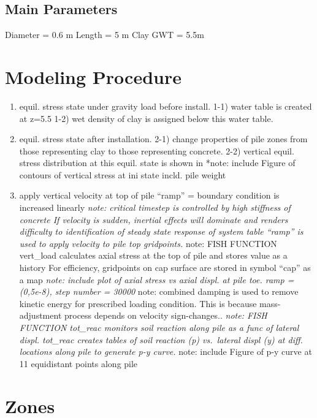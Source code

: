 \documentclass[a4paper, nobind]{templates/ociamthesis}
\providecommand{\tightlist}{%
  \setlength{\itemsep}{0pt}\setlength{\parskip}{0pt}}
\begin{document}
\hypertarget{main-parameters}{%
\subsection{Main Parameters}\label{main-parameters}}

Diameter = 0.6 m
Length = 5 m
Clay
GWT = 5.5m

\hypertarget{modeling-procedure}{%
\section{Modeling Procedure}\label{modeling-procedure}}

\begin{enumerate}
\def\labelenumi{\arabic{enumi})}
\tightlist
\item
  equil. stress state under gravity load before install.
  1-1) water table is created at z=5.5
  1-2) wet density of clay is assigned below this water table.
\item
  equil. stress state after installation.
  2-1) change properties of pile zones from those
  representing clay to those representing concrete.
  2-2) vertical equil. stress distribution at this equil. state is shown in
  *note: include Figure of contours of vertical stress at ini state incld. pile weight
\item
  apply vertical velocity at top of pile
  ``ramp'' = boundary condition is increased linearly
  \emph{note: critical timestep is controlled by high stiffness of concrete
  If velocity is sudden, inertial effects will dominate and renders difficulty to identification of steady state response of system
  table ``ramp'' is used to apply velocity to pile top gridpoints.
  }note: FISH FUNCTION vert\_load calculates axial stress at the top of pile and stores value as a history
  For efficiency, gridpoints on cap surface are stored in symbol ``cap'' as a map
  \emph{note: include plot of axial stress vs axial displ. at pile toe. ramp = (0,5e-8), step number = 30000
  }note: combined damping is used to remove kinetic energy for prescribed loading condition. This is because mass-adjustment process depends on velocity sign-changes..
  \emph{note: FISH FUNCTION tot\_reac monitors soil reaction along pile as a func of lateral displ. tot\_reac creates tables of soil reaction (p) vs.~lateral displ (y) at diff. locations along pile to generate p-y curve.
  }note: include Figure of p-y curve at 11 equidistant points along pile
\end{enumerate}

\hypertarget{zones}{%
\section{Zones}\label{zones}}
\end{document}
